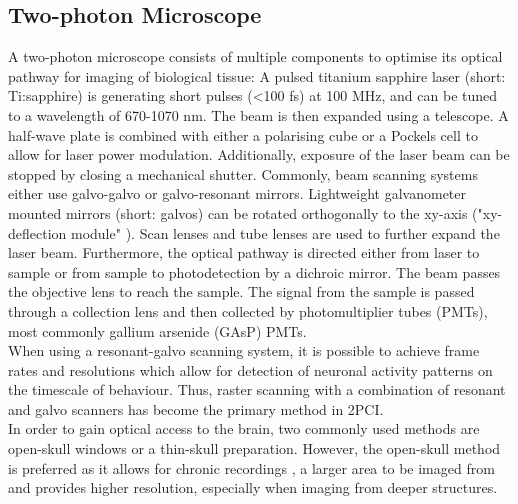\subsection{Two-photon Microscope}
A two-photon microscope consists of multiple components to optimise its optical pathway for imaging of biological tissue: A pulsed titanium sapphire laser (short: Ti:sapphire) is generating short pulses (<100 fs) at 100 MHz, and can be tuned to a wavelength of 670-1070 nm. The beam is then expanded using a telescope. \cite{Denk2005} A half-wave plate is combined with either a polarising cube or a Pockels cell to allow for laser power modulation. Additionally, exposure of the laser beam can be stopped by closing a mechanical shutter. Commonly, beam scanning systems either use galvo-galvo or galvo-resonant mirrors.  Lightweight galvanometer mounted mirrors (short: galvos) can be rotated orthogonally to the xy-axis ("xy-deflection module" \cite{Denk2005}). \cite{Grienberger2022} Scan lenses and tube lenses are used to further expand the laser beam. \cite{Denk2005} Furthermore, the optical pathway is directed either from laser to sample or from sample to photodetection by a dichroic mirror. The beam passes the objective lens to reach the sample. The signal from the sample is passed through a collection lens and then collected by photomultiplier tubes (PMTs), most commonly gallium arsenide (GAsP) PMTs. \cite{Grienberger2022}
\\
When using a resonant-galvo scanning system, it is possible to achieve frame rates and resolutions which allow for detection of neuronal activity patterns on the timescale of behaviour. Thus, raster scanning with a combination of resonant and galvo scanners has become the primary method in 2PCI. \cite{Grienberger2022} \\
In order to gain optical access to the brain, two commonly used methods are open-skull windows or a thin-skull preparation. \cite{Grienberger2022} However, the open-skull method is preferred as it allows for chronic recordings \cite{Grienberger2022}, \cite{Denk2005} a larger area to be imaged from and provides higher resolution, especially when imaging from deeper structures. \cite{Grienberger2022} 
